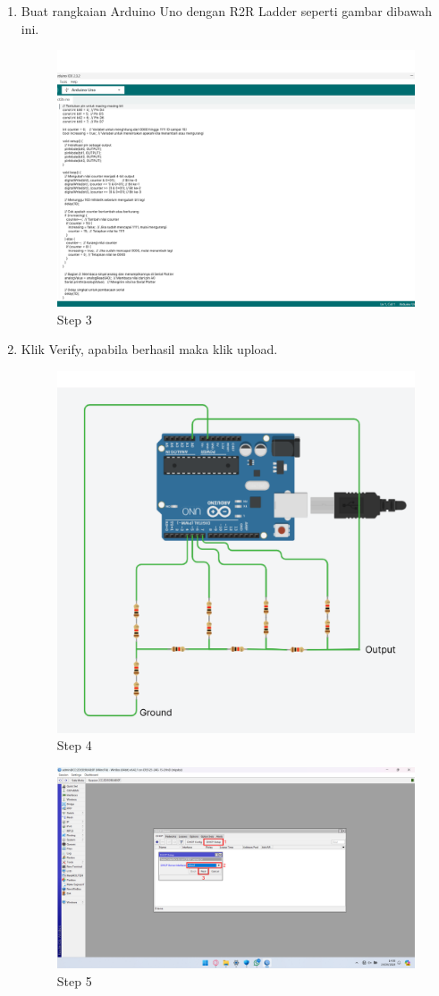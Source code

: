 \begin{center}
\begin{enumerate}
        \item Buat rangkaian Arduino Uno dengan R2R Ladder seperti gambar dibawah ini.
        \begin{figure}[H]
			\centering
			\includegraphics[width=0.8\linewidth]{P3/img/Step 3.png}
			\caption{Step 3}
			\label{fig:Step 3}
		\end{figure}
        \item Klik Verify, apabila berhasil maka klik upload.
        \begin{figure}[H]
			\centering
			\includegraphics[width=0.8\linewidth]{P3/img/step 4.png}
			\caption{Step 4}
			\label{fig:Step 4}
		\end{figure}

		\begin{figure}[H]
			\centering
			\includegraphics[width=0.8\linewidth]{P3/img/step 5.png}
			\caption{Step 5}
			\label{fig:Step 5}
		\end{figure}


\end{enumerate}
\end{center}
